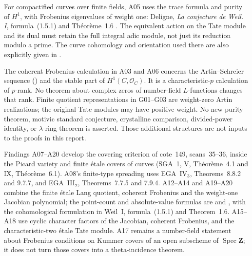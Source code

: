 For compactified curves over finite fields, A05 uses the trace
formula and purity of $H^1$, with Frobenius eigenvalues of weight one:
Deligne, \emph{La conjecture de Weil. I}, formula~(1.5.1) and
Th\'eor\`eme~1.6 \cite{WeilI}. The equivalent action on the
Tate module and its dual must retain the full integral adic module,
not just its reduction modulo a prime. The curve cohomology and
orientation used there are also explicitly given in
\cite[Proposition~14.2 and Remark~14.10]{MilneLEC}.

The coherent Frobenius calculation in A03 and A06 concerns the
Artin--Schreier sequence (\cite[Example~7.9(b)]{MilneLEC}) and the stable part of $H^1(C,\mathcal O_C)$.
It is a characteristic-$p$ calculation of $p$-rank. No theorem about
complex zeros of number-field $L$-functions changes that rank.
Finite quotient representations in G01--G03 are weight-zero Artin
realizations; the original Tate modules may have positive weight.
No new purity theorem, motivic standard conjecture, crystalline
comparison, divided-power identity, or $\lambda$-ring theorem is
asserted. Those additional structures are not inputs to the proofs
in this report.


Findings A07--A20 develop the covering criterion of cote~149,
scans~35--36, inside the Picard variety and finite \'etale covers of
curves (SGA~1, V, Th\'eor\`eme~4.1 and IX, Th\'eor\`eme~6.1).
A08's finite-type spreading uses EGA~IV$_3$, Theorems~8.8.2 and
9.7.7, and EGA~III$_2$, Theorems~7.7.5 and 7.9.4.
A12--A14 and A19--A20 combine the finite \'etale Lang quotient,
coherent Frobenius and the weight-one Jacobian polynomial; the
point-count and absolute-value formulas are
\cite[Theorem~19.1(a)--(c)]{MilneAV} and
\cite[Theorem~11.1]{MilneJV}, with the cohomological formulation
in Weil~I, formula~(1.5.1) and Theorem~1.6.
A15--A18 use cyclic character factors of the Jacobian, coherent
Frobenius, and the characteristic-two \'etale Tate module.
A17 remains a number-field statement about Frobenius conditions
on Kummer covers of an open subscheme of $\operatorname{Spec}\mathbf Z$;
it does not turn those covers into a theta-incidence theorem.
